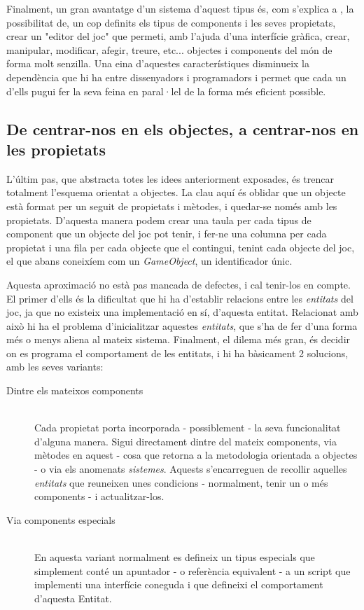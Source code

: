 Finalment, un gran avantatge d'un sistema d'aquest tipus és, com s'explica a \cite{Leonard99}, la possibilitat de, un cop definits els tipus de components i les seves propietats, crear un "editor del joc" que permeti, amb l'ajuda d'una interfície gràfica, crear, manipular, modificar, afegir, treure, etc... objectes i components del món de forma molt senzilla. Una eina d'aquestes característiques disminueix la dependència que hi ha entre dissenyadors i programadors i permet que cada un d'ells pugui fer la seva feina en paral·lel de la forma més eficient possible.

\subsection{De centrar-nos en els objectes, a centrar-nos en les propietats}

L'últim pas, que abstracta totes les idees anteriorment exposades, és trencar totalment l'esquema orientat a objectes. La clau aquí és oblidar que un objecte està format per un seguit de propietats i mètodes, i quedar-se només amb les propietats. D'aquesta manera podem crear una taula per cada tipus de component que un objecte del joc pot tenir, i fer-ne una columna per cada propietat i una fila per cada objecte que el contingui, tenint cada objecte del joc, el que abans coneixíem com un {\em GameObject}, un identificador únic.

Aquesta aproximació no està pas mancada de defectes, i cal tenir-los en compte. El primer d'ells és la dificultat que hi ha d'establir relacions entre les {\em entitats} del joc, ja que no existeix una implementació en sí, d'aquesta entitat. Relacionat amb això hi ha el problema d'inicialitzar aquestes {\em entitats}, que s'ha de fer d'una forma més o menys aliena al mateix sistema. Finalment, el dilema més gran, és decidir on es programa el comportament de les entitats, i hi ha bàsicament 2 solucions, amb les seves variants:

\begin{description}
  \item[Dintre els mateixos components] \hfill \\
    Cada propietat porta incorporada - possiblement - la seva funcionalitat d'alguna manera. Sigui directament dintre del mateix components, via mètodes en aquest - cosa que retorna a la metodologia orientada a objectes - o via els anomenats {\em sistemes}. Aquests s'encarreguen de recollir aquelles {\em entitats} que reuneixen unes condicions - normalment, tenir un o més components - i actualitzar-los.
    
  \item[Via components especials] \hfill \\
    En aquesta variant normalment es defineix un tipus especials que simplement conté un apuntador - o referència equivalent - a un script que implementi una interfície coneguda i que defineixi el comportament d'aquesta Entitat.
    
\end{description}

